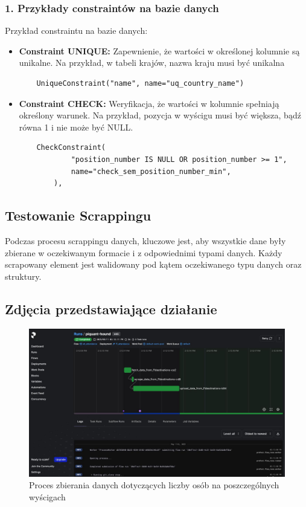 \documentclass[12pt]{article}
\begin{document}
\subsubsection{1. Przykłady constraintów na bazie danych}

Przykład constraintu na bazie danych:
\begin{itemize}
    \item \textbf{Constraint UNIQUE:} Zapewnienie, że wartości w określonej kolumnie są unikalne. Na przykład, w tabeli krajów, nazwa kraju musi być unikalna
    \begin{verbatim}
    UniqueConstraint("name", name="uq_country_name")
    \end{verbatim}
    \item \textbf{Constraint CHECK:} Weryfikacja, że wartości w kolumnie spełniają określony warunek. Na przykład, pozycja w wyścigu musi być większa, bądź równa 1 i nie może być NULL.
    \begin{verbatim}
    CheckConstraint(
            "position_number IS NULL OR position_number >= 1",
            name="check_sem_position_number_min",
        ),
    \end{verbatim}
\end{itemize}

\subsection{Testowanie Scrappingu}

Podczas procesu scrappingu danych, kluczowe jest, aby wszystkie dane były zbierane w oczekiwanym formacie i z odpowiednimi typami danych. Każdy scrapowany element jest walidowany pod kątem oczekiwanego typu danych oraz struktury.


\subsection{Zdjęcia przedstawiające działanie}
\begin{figure}[H]
    \centering
    \includegraphics[width=\textwidth]{sc1.jpg}
    \caption{Proces zbierania danych dotyczących liczby osób na poszczególnych wyścigach}
\end{figure}
\end{document}
